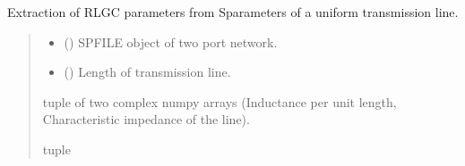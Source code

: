 \documentclass[letterpaper,10pt,english]{sphinxmanual}
\begin{document}
\begin{fulllineitems}
\label{\detokenize{touchstone:touchstone.extract_rlgc}}
\pysigstartsignatures
{}
\pysigstopsignatures
\sphinxAtStartPar
Extraction of RLGC parameters from S\sphinxhyphen{}parameters of a uniform transmission line.
\begin{quote}\begin{description}
\begin{itemize}
\item {}
\sphinxAtStartPar
{} () \textendash{} SPFILE object of two port network.

\item {}
\sphinxAtStartPar
{} () \textendash{} Length of transmission line.

\end{itemize}

\sphinxAtStartPar
tuple of two complex numpy arrays (Inductance per unit length, Characteristic impedance of the line).

\sphinxAtStartPar
tuple

\end{description}\end{quote}

\end{fulllineitems}

\end{document}
